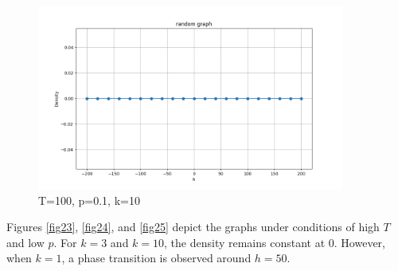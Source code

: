 \documentclass[11pt]{book}
\begin{document}
\begin{figure}
\begin{minipage}{0.45\textwidth}
        \centering
        \includegraphics[width=0.9\textwidth]{rg.T=100, p=0.1 k=10.png} %
        \caption{T=100, p=0.1, k=10}
        \label{fig25}
    \end{minipage}\hfill
\end{figure}

Figures \eqref{fig23}, \eqref{fig24}, and \eqref{fig25} depict the graphs under conditions of high $T$ and low $p$. For $k=3$ and $k=10$, the density remains constant at $0$. However, when $k=1$, a phase transition is observed around $h=50$.
\end{document}
